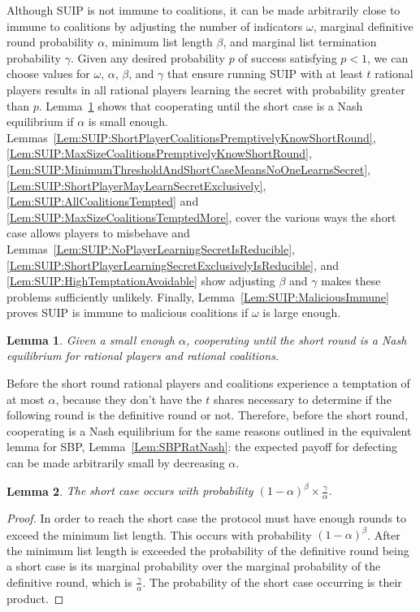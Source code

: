 \documentclass{dalcsthesis}
\newtheorem{lemma}{Lemma}
\begin{document}
Although SUIP is not immune to coalitions, it can be made arbitrarily close to immune to coalitions by adjusting the number of indicators $\omega$, marginal definitive round probability $\alpha$, minimum list length $\beta$, and marginal list termination probability $\gamma$. Given any desired probability $p$ of success satisfying $p < 1$, we can choose values for $\omega$, $\alpha$, $\beta$, and $\gamma$ that ensure running SUIP with at least $t$ rational players results in all rational players learning the secret with probability greater than $p$. Lemma~\ref{Lem:SUIP:RatNashCoop} shows that cooperating until the short case is a Nash equilibrium if $\alpha$ is small enough. Lemmas~\ref{Lem:SUIP:ShortPlayerCoalitionsPremptivelyKnowShortRound}, \ref{Lem:SUIP:MaxSizeCoalitionsPremptivelyKnowShortRound}, \ref{Lem:SUIP:MinimumThresholdAndShortCaseMeansNoOneLearnsSecret}, \ref{Lem:SUIP:ShortPlayerMayLearnSecretExclusively}, \ref{Lem:SUIP:AllCoalitionsTempted} and \ref{Lem:SUIP:MaxSizeCoalitionsTemptedMore}, cover the various ways the short case allows players to misbehave and Lemmas~\ref{Lem:SUIP:NoPlayerLearningSecretIsReducible}, \ref{Lem:SUIP:ShortPlayerLearningSecretExclusivelyIsReducible}, and \ref{Lem:SUIP:HighTemptationAvoidable} show adjusting $\beta$ and $\gamma$ makes these problems sufficiently unlikely. Finally, Lemma~\ref{Lem:SUIP:MaliciousImmune} proves SUIP is immune to malicious coalitions if $\omega$ is large enough.

\begin{lemma}\label{Lem:SUIP:RatNashCoop}Given a small enough $\alpha$, cooperating until the short round is a Nash equilibrium for rational players and rational coalitions.\end{lemma}

Before the short round rational players and coalitions experience a temptation of at most $\alpha$, because they don't have the $t$ shares necessary to determine if the following round is the definitive round or not. Therefore, before the short round, cooperating is a Nash equilibrium for the same reasons outlined in the equivalent lemma for SBP, Lemma~\ref{Lem:SBPRatNash}: the expected payoff for defecting can be made arbitrarily small by decreasing $\alpha$.

\begin{lemma}\label{Lem:SUIP:ChanceOfShortCase}The short case occurs with probability $(1-\alpha)^\beta \times \frac{\gamma}{\alpha}$.\end{lemma}
\begin{proof}
In order to reach the short case the protocol must have enough rounds to exceed the minimum list length. This occurs with probability $(1-\alpha)^\beta$. After the minimum list length is exceeded the probability of the definitive round being a short case is its marginal probability over the marginal probability of the definitive round, which is $\frac{\gamma}{\alpha}$. The probability of the short case occurring is their product.
\end{proof}
\end{document}
